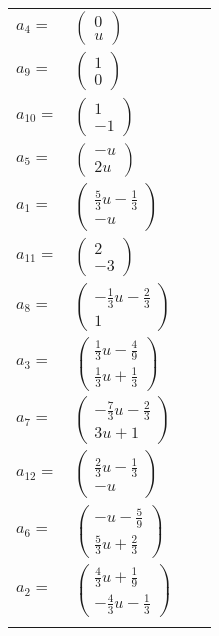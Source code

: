 \documentclass[1p]{elsarticle_modified}
\theoremstyle{definition}
\begin{document}
\begin{tabular}{m{7pt} m{180pt} m{7pt} m{180pt} }
\flushright $a_{4}=$&$\begin{pmatrix}0\\u\end{pmatrix}$ \\
\flushright $a_{9}=$&$\begin{pmatrix}1\\0\end{pmatrix}$ \\
\flushright $a_{10}=$&$\begin{pmatrix}1\\-1\end{pmatrix}$ \\
\flushright $a_{5}=$&$\begin{pmatrix}- u\\2 u\end{pmatrix}$ \\
\flushright $a_{1}=$&$\begin{pmatrix}\frac{5}{3} u-\frac{1}{3}\\- u\end{pmatrix}$ \\
\flushright $a_{11}=$&$\begin{pmatrix}2\\-3\end{pmatrix}$ \\
\flushright $a_{8}=$&$\begin{pmatrix}-\frac{1}{3} u-\frac{2}{3}\\1\end{pmatrix}$ \\
\flushright $a_{3}=$&$\begin{pmatrix}\frac{1}{3} u-\frac{4}{9}\\\frac{1}{3} u+\frac{1}{3}\end{pmatrix}$ \\
\flushright $a_{7}=$&$\begin{pmatrix}-\frac{7}{3} u-\frac{2}{3}\\3 u+1\end{pmatrix}$ \\
\flushright $a_{12}=$&$\begin{pmatrix}\frac{2}{3} u-\frac{1}{3}\\- u\end{pmatrix}$ \\
\flushright $a_{6}=$&$\begin{pmatrix}- u-\frac{5}{9}\\\frac{5}{3} u+\frac{2}{3}\end{pmatrix}$ \\
\flushright $a_{2}=$&$\begin{pmatrix}\frac{4}{3} u+\frac{1}{9}\\-\frac{4}{3} u-\frac{1}{3}\end{pmatrix}$\\&\end{tabular}
\end{document}
